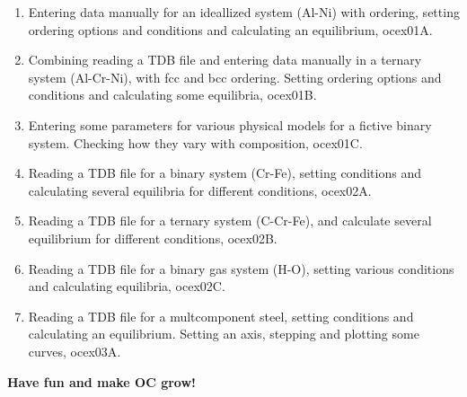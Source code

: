 \documentclass[12pt]{article}
\begin{document}
\begin{enumerate}
\item Entering data manually for an ideallized system (Al-Ni) with
ordering, setting ordering options and conditions and calculating an
equilibrium, ocex01A.

\item Combining reading a TDB file and entering data manually in a
ternary system (Al-Cr-Ni), with fcc and bcc ordering.  Setting
ordering options and conditions and calculating some equilibria,
ocex01B.

\item Entering some parameters for various physical models for a
fictive binary system.  Checking how they vary with composition,
ocex01C.

\item Reading a TDB file for a binary system (Cr-Fe), setting
conditions and calculating several equilibria for different
conditions, ocex02A.

\item Reading a TDB file for a ternary system (C-Cr-Fe), and calculate
several equilibrium for different conditions, ocex02B.

\item Reading a TDB file for a binary gas system (H-O), setting 
various conditions and calculating equilibria, ocex02C.

\item Reading a TDB file for a multcomponent steel, setting conditions
and calculating an equilibrium.  Setting an axis, stepping and
plotting some curves, ocex03A.
\end{enumerate}

{\large \bf Have fun and make OC grow!}
\end{document}
